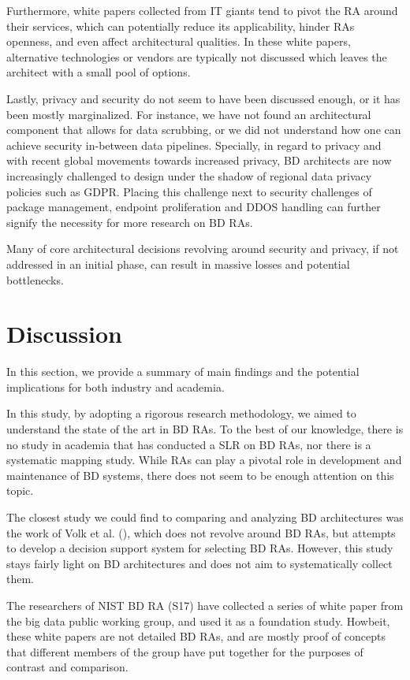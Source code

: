 \documentclass{ieeeaccess}
\begin{document}
Furthermore, white papers collected from IT giants tend to pivot the RA around their services, which can potentially reduce its applicability, hinder RAs openness, and even affect architectural qualities. In these white papers, alternative technologies or vendors are typically not discussed which leaves the architect with a small pool of options.

Lastly, privacy and security do not seem to have been discussed enough, or it has been mostly marginalized. For instance, we have not found an architectural component that allows for data scrubbing, or we did not understand how one can achieve security in-between data pipelines. Specially, in regard to privacy and with recent global movements towards increased privacy, BD architects are now increasingly challenged to design under the shadow of regional data privacy policies such as GDPR. Placing this challenge next to security challenges of package management, endpoint proliferation and DDOS handling can further signify the necessity for more research on BD RAs.

Many of core architectural decisions revolving around security and privacy, if not addressed in an initial phase, can result in massive losses and potential bottlenecks. 

\section{Discussion}

In this section, we provide a summary of main findings and the potential implications for both industry and academia. 

In this study, by adopting a rigorous research methodology, we aimed to understand the state of the art in BD RAs. To the best of our knowledge, there is no study in academia that has conducted a SLR on BD RAs, nor there is a systematic mapping study. While RAs can play a pivotal role in development and maintenance of BD systems, there does not seem to be enough attention on this topic. 

The closest study we could find to comparing and analyzing BD architectures was the work of Volk et al. (\cite{volk2019decision}), which does not revolve around BD RAs, but attempts to develop a decision support system for selecting BD RAs. However, this study stays fairly light on BD architectures and does not aim to systematically collect them. 

The researchers of NIST BD RA (S17) have collected a series of white paper from the big data public working group, and used it as a foundation study. Howbeit, these white papers are not detailed BD RAs, and are mostly proof of concepts that different members of the group have put together for the purposes of contrast and comparison. 
\end{document}
